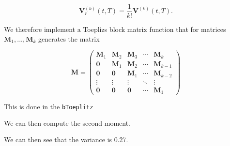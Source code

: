 \documentclass[
]{book}
\begin{document}
\[
\mathbf V_r^{(k)}(t,T)=\frac{1}{k!}\mathbf V^{(k)}(t,T).
\]

We therefore implement a Toeplizs block matrix function that for matrices \(\mathbf M_1,...,\mathbf M_k\) generates the matrix

\[
\mathbf M=\begin{pmatrix}
\mathbf M_1 & \mathbf M_2 & \mathbf M_3 &\cdots & \mathbf M_k\\
\mathbf 0 & \mathbf M_1 & \mathbf M_2 & \cdots & \mathbf M_{k-1}\\
\mathbf 0 & \mathbf 0 & \mathbf M_1 & \cdots & \mathbf M_{k-2}\\
\vdots & \vdots & \vdots & \ddots & \vdots\\
\mathbf 0 & \mathbf 0 & \mathbf 0 & \cdots & \mathbf M_1
\end{pmatrix}
\]

This is done in the \texttt{bToeplitz}

We can then compute the second moment.

We can then see that the variance is 0.27.

\newpage

\printindex

  
\end{document}
